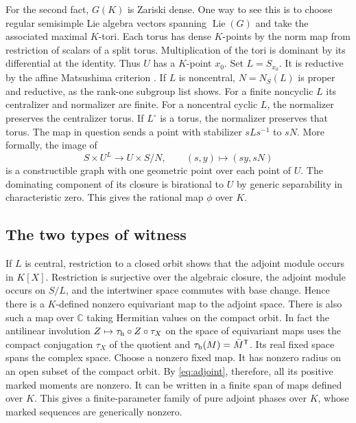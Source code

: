\documentclass[11pt]{article}
\newcommand{\CC}{\mathbb C}
\newcommand{\Lie}{\operatorname{Lie}}
\begin{document}
For the second fact, \(G(K)\) is Zariski dense. One way to see this is
to choose regular semisimple Lie algebra vectors spanning \(\Lie(G)\)
and take the associated maximal \(K\)-tori. Each torus has dense
\(K\)-points by the norm map from restriction of scalars of a split
torus. Multiplication of the tori is dominant by its differential at
the identity. Thus \(U\) has a \(K\)-point \(x_0\). Set \(L=S_{x_0}\).
It is reductive by the affine Matsushima criterion \cite{Matsushima}.
If \(L\) is noncentral, \(N=N_S(L)\) is proper and reductive, as the
rank-one subgroup list shows. For a finite noncyclic \(L\) its
centralizer and normalizer are finite. For a noncentral cyclic \(L\),
the normalizer preserves the centralizer torus. If \(L^\circ\) is
a torus, the normalizer preserves that torus. The map in question
sends a point with stabilizer \(sLs^{-1}\) to \(sN\). More formally,
the image of
\[
 S\times U^L\longrightarrow U\times S/N,\qquad
 (s,y)\longmapsto(sy,sN)
\]
is a constructible graph with one geometric point over each point
of \(U\). The dominating component of its closure is birational
to \(U\) by generic separability in characteristic zero. This
gives the rational map \(\phi\) over \(K\).

\subsection*{The two types of witness}

If \(L\) is central, restriction to a closed orbit shows that the
adjoint module occurs in \(K[X]\). Restriction is surjective over
the algebraic closure, the adjoint module occurs on \(S/L\), and
the intertwiner space commutes with base change. Hence there is
a \(K\)-defined nonzero equivariant map to the adjoint space.
There is also such a map over \(\CC\) taking Hermitian values on the
compact orbit. In fact the antilinear involution
\(
 Z\mapsto \tau_{\rm h}\circ Z\circ\tau_X
\)
on the space of equivariant maps uses the compact conjugation
\(\tau_X\) of the quotient and \(\tau_{\rm h}(M)=\bar M^{\mathsf T}\).
Its real fixed space spans the complex space. Choose a nonzero
fixed map. It has nonzero radius on an open subset of the compact
orbit. By \eqref{eq:adjoint}, therefore, all its positive marked
moments are nonzero. It can be written in a finite span of maps
defined over \(K\). This gives a finite-parameter family of pure
adjoint phases over \(K\), whose marked sequences are generically
nonzero.
\end{document}
